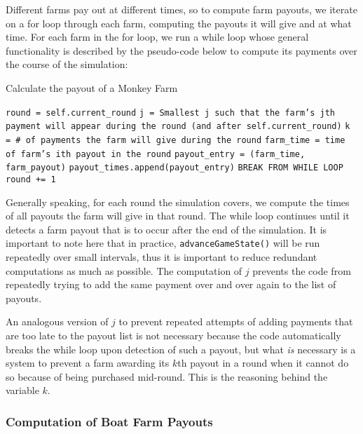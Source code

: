 \documentclass[12pt,letterpaper]{article}
\theoremstyle{remark}
\theoremstyle{plain}
\begin{document}
Different farms pay out at different times, so to compute farm payouts, we iterate on a for loop through each farm, computing the payouts it will give and at what time. For each farm in the for loop, we run a while loop whose general functionality is described by the pseudo-code below to compute its payments over the course of the simulation:

\begin{algorithm}
\caption{Calculate the payout of a Monkey Farm}
\begin{algorithmic}
\State \texttt{round = self.current\_round}
    \State \texttt{j = Smallest j such that the farm's jth payment will appear during the round (and after \texttt{self.current\_round})}
    \State \texttt{k = \# of payments the farm will give during the round}
        \State \texttt{farm\_time = time of farm's ith payout in the round}
            \State \texttt{payout\_entry = (farm\_time, farm\_payout)}
            \State \texttt{payout\_times.append(payout\_entry)}
        \Else
            \State \texttt{BREAK FROM WHILE LOOP}
        \EndIf
    \EndFor
    \State \texttt{round += 1}
\EndWhile
\end{algorithmic}
\end{algorithm}

Generally speaking, for each round the simulation covers, we compute the times of all payouts the farm will give in that round. The while loop continues until it detects a farm payout that is to occur after the end of the simulation. It is important to note here that in practice, \texttt{advanceGameState()} will be run repeatedly over small intervals, thus it is important to reduce redundant computations as much as possible. The computation of $j$ prevents the code from repeatedly trying to add the same payment over and over again to the list of payouts. 

An analogous version of $j$ to prevent repeated attempts of adding payments that are too late to the payout list is not necessary because the code automatically breaks the while loop upon detection of such a payout, but what \textit{is} necessary is a system to prevent a farm awarding its $k$th payout in a round when it cannot do so because of being purchased mid-round. This is the reasoning behind the variable $k$. 

\subsubsection{Computation of Boat Farm Payouts}
\end{document}
